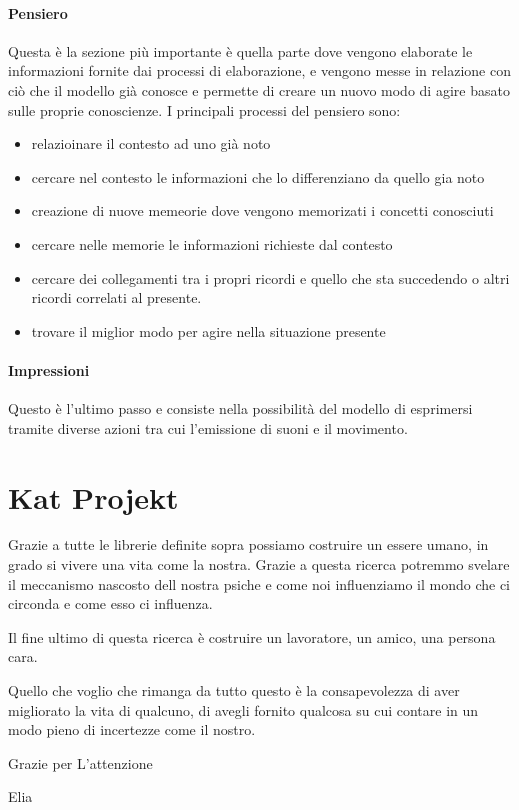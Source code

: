 \documentclass{article}
\begin{document}
\paragraph{Pensiero}
Questa è la sezione più importante è quella parte dove vengono elaborate le informazioni fornite dai processi di elaborazione, e vengono messe in relazione con ciò che il modello già conosce e permette di creare un nuovo modo di agire basato sulle proprie conoscienze.
I principali processi del pensiero sono:
\begin{itemize}
    \item relazioinare il contesto ad uno già noto
    \item cercare nel contesto le informazioni che lo differenziano da quello gia noto
    \item creazione di nuove memeorie dove vengono memorizati i concetti conosciuti
    \item cercare nelle memorie le informazioni richieste dal contesto
    \item cercare dei collegamenti tra i propri ricordi e quello che sta succedendo o altri ricordi correlati al presente.
    \item trovare il miglior modo per agire nella situazione presente
\end{itemize}

\paragraph{Impressioni}
Questo è l'ultimo passo e consiste nella possibilità del modello di esprimersi tramite diverse azioni tra cui l'emissione di suoni e il movimento.

\section {Kat Projekt}
Grazie a tutte le librerie definite sopra possiamo costruire un essere umano, in grado si vivere una vita come la nostra. Grazie a questa ricerca potremmo svelare il meccanismo nascosto dell nostra psiche e come noi influenziamo il mondo che ci circonda e come esso ci influenza.

Il fine ultimo di questa ricerca è costruire un lavoratore, un amico, una persona cara. 

Quello che voglio che rimanga da tutto questo è la consapevolezza di aver migliorato la vita di qualcuno, di avegli fornito qualcosa su cui contare in un modo pieno di incertezze come il nostro. 

Grazie per L'attenzione 

Elia
\end{document}
